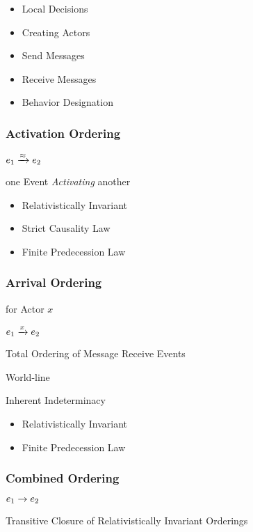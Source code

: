 \begin{itemize}
  \item Local Decisions
  \item Creating Actors
  \item Send Messages
  \item Receive Messages
  \item Behavior Designation
\end{itemize}



\subsubsection{Activation Ordering}\label{sec:activation_ordering}

$e_1 \xrightarrow{\approx} e_2$

one Event \emph{Activating} another

\begin{itemize}
  \item Relativistically Invariant
  \item Strict Causality Law
  \item Finite Predecession Law
\end{itemize}



\subsubsection{Arrival Ordering}\label{sec:arrival_ordering}

for Actor $x$

$e_1 \xrightarrow{x} e_2$

Total Ordering of Message Receive Events

World-line

Inherent Indeterminacy

\begin{itemize}
  \item Relativistically Invariant
  \item Finite Predecession Law
\end{itemize}



\subsubsection{Combined Ordering}\label{sec:combined_ordering}

$e_1 \rightarrow e_2$

Transitive Closure of Relativistically Invariant Orderings

